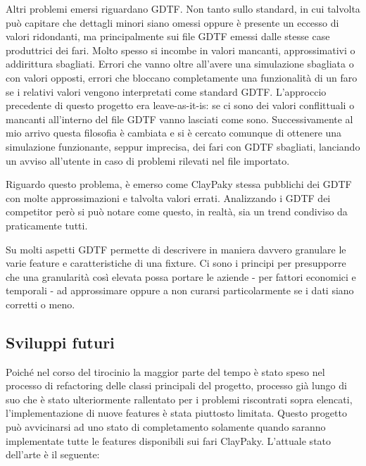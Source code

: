 \documentclass[main.tex]{subfiles}
\begin{document}
Altri problemi emersi riguardano GDTF. Non tanto sullo standard, in cui talvolta può capitare che dettagli minori siano omessi oppure è presente un eccesso di valori ridondanti, ma principalmente sui file GDTF emessi dalle stesse case produttrici dei fari. Molto spesso si incombe in valori mancanti, approssimativi o addirittura sbagliati. Errori che vanno oltre all'avere una simulazione sbagliata o con valori opposti, errori che bloccano completamente una funzionalità di un faro se i relativi valori vengono interpretati come standard GDTF. L'approccio precedente di questo progetto era leave-as-it-is: se ci sono dei valori conflittuali o mancanti all'interno del file GDTF vanno lasciati come sono. Successivamente al mio arrivo questa filosofia è cambiata e si è cercato comunque di ottenere una simulazione funzionante, seppur imprecisa, dei fari con GDTF sbagliati, lanciando un avviso all'utente in caso di problemi rilevati nel file importato.

Riguardo questo problema, è emerso come ClayPaky stessa pubblichi dei GDTF con molte approssimazioni e talvolta valori errati. Analizzando i GDTF dei competitor però si può notare come questo, in realtà, sia un trend condiviso da praticamente tutti. 

\noindent Su molti aspetti GDTF permette di descrivere in maniera davvero granulare le varie feature e caratteristiche di una fixture. Ci sono i principi per presupporre che una granularità così elevata possa portare le aziende - per fattori economici e temporali - ad approssimare oppure a non curarsi particolarmente se i dati siano corretti o meno. 

\clearpage
\subsection{Sviluppi futuri}\label{subsec:6_newDevelops}
Poiché nel corso del tirocinio la maggior parte del tempo è stato speso nel processo di refactoring delle classi principali del progetto, processo già lungo di suo che è stato ulteriormente rallentato per i problemi riscontrati sopra elencati, l'implementazione di nuove features è stata piuttosto limitata. Questo progetto può avvicinarsi ad uno stato di completamento solamente quando saranno implementate tutte le features disponibili sui fari ClayPaky. L'attuale stato dell'arte è il seguente: \newline
\end{document}
